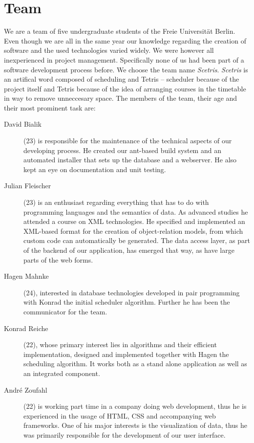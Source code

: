 
\section{Team}
\label{sec:team}

We are a team of five undergraduate students of the Freie Universität Berlin. Even though we are all in the same year our knowledge regarding the creation of software and the used technologies varied widely. We were however all inexperienced in project management. Specifically none of us had been part of a software development process before. We choose the team name \emph{Scetris}. \emph{Scetris} is an artifical word composed of scheduling and Tetris -- scheduler because of the project itself and Tetris because of the idea of arranging courses in the timetable in way to remove unneccesary space. The members of the team, their age and their most prominent task are:

\begin{description}
	\item[David Bialik] (23) is responsible for the maintenance of the technical aspects of our developing process. He created our ant-based build system and an automated installer that sets up the database and a webserver. He also kept an eye on documentation and unit testing.
	\item[Julian Fleischer] (23) is an enthusiast regarding everything that has to do with programming languages and the semantics of data. As advanced studies he attended a course on XML technologies. He specified and implemented an XML-based format for the creation of object-relation models, from which custom code can automatically be generated. The data access layer, as part of the backend of our application, has emerged that way, as have large parts of the web forms.
	\item[Hagen Mahnke] (24), interested in database technologies developed in pair programming with Konrad the initial scheduler algorithm. Further he has been the communicator for the team.
	\item[Konrad Reiche] (22), whose primary interest lies in algorithms and their efficient implementation, designed and implemented together with Hagen the scheduling algorithm. It works both as a stand alone application as well as an integrated component.
	\item[André Zoufahl] (22) is working part time in a company doing web development, thus he is experienced in the usage of HTML, CSS and accompanying web frameworks. One of his major interests is the visualization of data, thus he was primarily responsible for the development of our user interface. 
\end{description}


